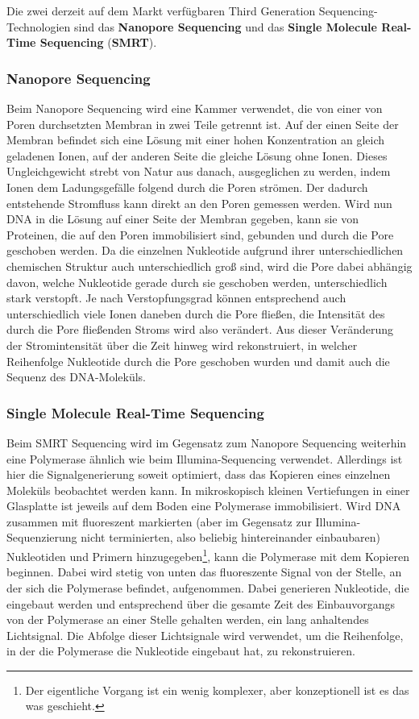 Die zwei derzeit auf dem Markt verfügbaren Third Generation Sequencing-Technologien sind das \textbf{Nanopore Sequencing} und das \textbf{Single Molecule Real-Time Sequencing} (\textbf{SMRT}).

\subsubsection{Nanopore Sequencing}

Beim Nanopore Sequencing wird eine Kammer verwendet, die von einer von Poren durchsetzten Membran in zwei Teile getrennt ist. Auf der einen Seite der Membran befindet sich eine Lösung mit einer hohen Konzentration an gleich geladenen Ionen, auf der anderen Seite die gleiche Lösung ohne Ionen. Dieses Ungleichgewicht strebt von Natur aus danach, ausgeglichen zu werden, indem Ionen dem Ladungsgefälle folgend durch die Poren strömen. Der dadurch entstehende Stromfluss kann direkt an den Poren gemessen werden. Wird nun DNA in die Lösung auf einer Seite der Membran gegeben, kann sie von Proteinen, die auf den Poren immobilisiert sind, gebunden und durch die Pore geschoben werden. Da die einzelnen Nukleotide aufgrund ihrer unterschiedlichen chemischen Struktur auch unterschiedlich groß sind, wird die Pore dabei abhängig davon, welche Nukleotide gerade durch sie geschoben werden, unterschiedlich stark verstopft. Je nach Verstopfungsgrad können entsprechend auch unterschiedlich viele Ionen daneben durch die Pore fließen, die Intensität des durch die Pore fließenden Stroms wird also verändert. Aus dieser Veränderung der Stromintensität über die Zeit hinweg wird rekonstruiert, in welcher Reihenfolge Nukleotide durch die Pore geschoben wurden und damit auch die Sequenz des DNA-Moleküls.

\subsubsection{Single Molecule Real-Time Sequencing}

Beim SMRT Sequencing wird im Gegensatz zum Nanopore Sequencing weiterhin eine Polymerase ähnlich wie beim Illumina-Sequencing verwendet. Allerdings ist hier die Signalgenerierung soweit optimiert, dass das Kopieren eines einzelnen Moleküls beobachtet werden kann. In mikroskopisch kleinen Vertiefungen in einer Glasplatte ist jeweils auf dem Boden eine Polymerase immobilisiert. Wird DNA zusammen mit fluoreszent markierten (aber im Gegensatz zur Illumina-Sequenzierung nicht terminierten, also beliebig hintereinander einbaubaren) Nukleotiden und Primern hinzugegeben\footnote{Der eigentliche Vorgang ist ein wenig komplexer, aber konzeptionell ist es das was geschieht.}, kann die Polymerase mit dem Kopieren beginnen. Dabei wird stetig von unten das fluoreszente Signal von der Stelle, an der sich die Polymerase befindet, aufgenommen. Dabei generieren Nukleotide, die eingebaut werden und entsprechend über die gesamte Zeit des Einbauvorgangs von der Polymerase an einer Stelle gehalten werden, ein lang anhaltendes Lichtsignal. Die Abfolge dieser Lichtsignale wird verwendet, um die Reihenfolge, in der die Polymerase die Nukleotide eingebaut hat, zu rekonstruieren. 

